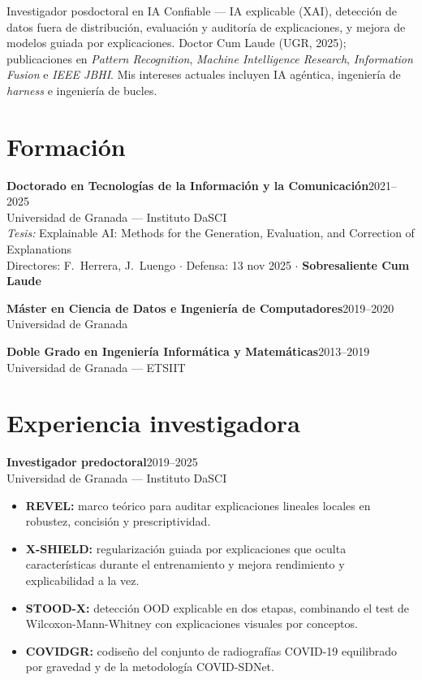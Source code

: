 \documentclass[10pt,a4paper]{article}
\newcommand{\job}[2]{\textbf{\color{ink}#1}\hfill{\footnotesize\color{muted}#2}}
\newcommand{\where}[1]{{\footnotesize\color{muted}#1}}
\begin{document}
Investigador posdoctoral en IA Confiable --- IA explicable (XAI), detección de datos fuera de distribución, evaluación y auditoría de explicaciones, y mejora de modelos guiada por explicaciones. Doctor Cum Laude (UGR, 2025); publicaciones en \textit{Pattern Recognition}, \textit{Machine Intelligence Research}, \textit{Information Fusion} e \textit{IEEE JBHI}. Mis intereses actuales incluyen IA agéntica, ingeniería de \textit{harness} e ingeniería de bucles.

\section*{Formación}

\job{Doctorado en Tecnologías de la Información y la Comunicación}{2021--2025}\\
\where{Universidad de Granada --- Instituto DaSCI}\\
{\footnotesize\textit{Tesis:} Explainable AI: Methods for the Generation, Evaluation, and Correction of Explanations}\\
{\footnotesize\color{muted}Directores: F.~Herrera, J.~Luengo $\cdot$ Defensa: 13 nov 2025 $\cdot$ \textbf{Sobresaliente Cum Laude}}

\vspace{0.35em}
\job{Máster en Ciencia de Datos e Ingeniería de Computadores}{2019--2020}\\
\where{Universidad de Granada}

\vspace{0.35em}
\job{Doble Grado en Ingeniería Informática y Matemáticas}{2013--2019}\\
\where{Universidad de Granada --- ETSIIT}

\section*{Experiencia investigadora}

\job{Investigador predoctoral}{2019--2025}\\
\where{Universidad de Granada --- Instituto DaSCI}
\begin{itemize}
  \item \textbf{REVEL:} marco teórico para auditar explicaciones lineales locales en robustez, concisión y prescriptividad.
  \item \textbf{X-SHIELD:} regularización guiada por explicaciones que oculta características durante el entrenamiento y mejora rendimiento y explicabilidad a la vez.
  \item \textbf{STOOD-X:} detección OOD explicable en dos etapas, combinando el test de Wilcoxon-Mann-Whitney con explicaciones visuales por conceptos.
  \item \textbf{COVIDGR:} codiseño del conjunto de radiografías COVID-19 equilibrado por gravedad y de la metodología COVID-SDNet.
\end{itemize}
\end{document}
